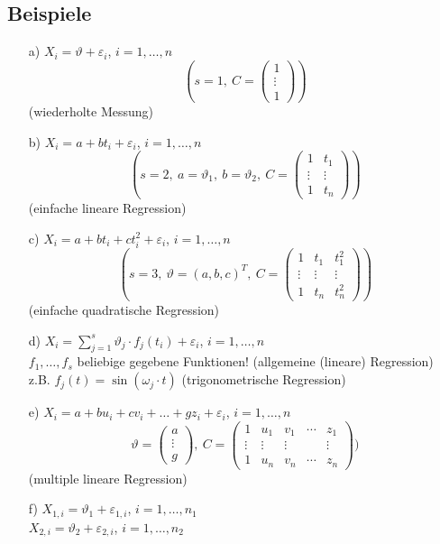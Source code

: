 \documentclass[a4paper,11pt,twoside,titlepage]{article}
\begin{document}
\subsection{Beispiele}
\begin{itemize}
\item[a) ]$X_i=\vartheta+\varepsilon_i$, $i=1,\ldots,n$
\[(s=1,\ C=\begin{pmatrix}1\\\vdots\\1\end{pmatrix})\]
(wiederholte Messung)
\item[b) ]$X_i=a+bt_i+\varepsilon_i$, $i=1,\ldots,n$
\[(s=2,\ a=\vartheta_1,\ b=\vartheta_2,\ C=\begin{pmatrix}1&t_1\\\vdots&\vdots\\1&t_n\end{pmatrix})\]
(einfache lineare Regression)
\item[c) ]$X_i=a+bt_i+ct_i^2+\varepsilon_i$, $i=1,\ldots,n$
\[(s=3,\ \vartheta=(a,b,c)^T,\ C=\begin{pmatrix}1&t_1&t_1^2\\\vdots&\vdots&\vdots\\1&t_n&t_n^2\end{pmatrix})\]
(einfache quadratische Regression)
\item[d) ]$X_i=\sum_{j=1}^s\vartheta_j\cdot f_j(t_i)+\varepsilon_i$, $i=1,\ldots,n$\\
$f_1,\ldots,f_s$ beliebige gegebene Funktionen! (allgemeine (lineare) Regression)\\
z.B. $f_j(t)=\sin(\omega_j\cdot t)$ (trigonometrische Regression)
\item[e) ]$X_i=a+bu_i+cv_i+\ldots+gz_i+\varepsilon_i$, $i=1,\ldots,n$
\[\vartheta=\begin{pmatrix}a\\\vdots\\g\end{pmatrix},\ C=\begin{pmatrix}1&u_1&v_1&\cdots&z_1\\\vdots&\vdots&\vdots&&\vdots\\1&u_n&v_n&\cdots&z_n\end{pmatrix})\]
(multiple lineare Regression)
\item[f) ]$X_{1,i}=\vartheta_1+\varepsilon_{1,i}$, $i=1,\ldots,n_1$\\
$X_{2,i}=\vartheta_2+\varepsilon_{2,i}$, $i=1,\ldots,n_2$

\end{itemize}
\end{document}
